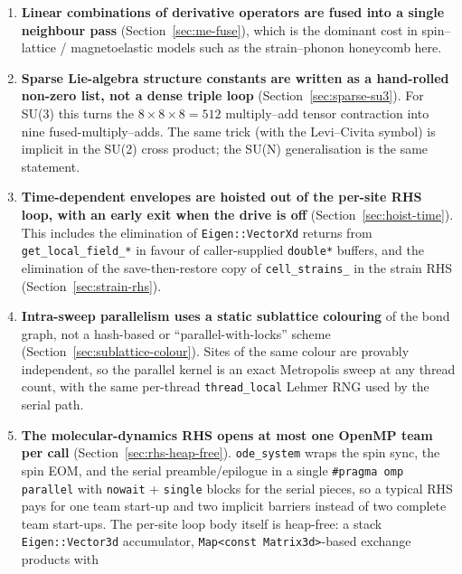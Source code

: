 \documentclass[11pt,letterpaper]{article}
\begin{document}
\begin{enumerate}[itemsep=2pt]
{        indices} (Section~\ref{sec:trilinear}) so that one Metropolis
        proposal costs $O(d^{3}) + O(d)$ instead of $2\,O(d^{3})$.
  \item \textbf{Linear combinations of derivative operators are fused
        into a single neighbour pass} (Section~\ref{sec:me-fuse}),
        which is the dominant cost in spin--lattice / magnetoelastic
        models such as the strain--phonon honeycomb here.
  \item \textbf{Sparse Lie-algebra structure constants are written
        as a hand-rolled non-zero list, not a dense triple loop}
        (Section~\ref{sec:sparse-su3}).  For SU(3) this turns the
        $8 \times 8 \times 8 = 512$ multiply--add tensor contraction
        into nine fused-multiply--adds.  The same trick (with the
        Levi--Civita symbol) is implicit in the SU(2) cross product;
        the SU(N) generalisation is the same statement.
  \item \textbf{Time-dependent envelopes are hoisted out of the
        per-site RHS loop, with an early exit when the drive is
        off} (Section~\ref{sec:hoist-time}).  This includes the
        elimination of \texttt{Eigen::VectorXd} returns from
        \texttt{get\_local\_field\_*} in favour of caller-supplied
        \texttt{double*} buffers, and the elimination of the
        save-then-restore copy of \texttt{cell\_strains\_} in the
        strain RHS (Section~\ref{sec:strain-rhs}).
  \item \textbf{Intra-sweep parallelism uses a static sublattice
        colouring} of the bond graph, not a hash-based or
        ``parallel-with-locks'' scheme
        (Section~\ref{sec:sublattice-colour}).  Sites of the same
        colour are provably independent, so the parallel kernel is
        an exact Metropolis sweep at any thread count, with the
        same per-thread \texttt{thread\_local} Lehmer RNG used by
        the serial path.
  \item \textbf{The molecular-dynamics RHS opens at most one
        OpenMP team per call} (Section~\ref{sec:rhs-heap-free}).
        \texttt{ode\_system} wraps the spin sync, the spin EOM,
        and the serial preamble/epilogue in a single
        \texttt{\#pragma omp parallel} with \texttt{nowait} +
        \texttt{single} blocks for the serial pieces, so a typical
        RHS pays for one team start-up and two implicit barriers
        instead of two complete team start-ups.  The per-site loop
        body itself is heap-free: a stack
        \texttt{Eigen::Vector3d} accumulator,
        \texttt{Map<const Matrix3d>}-based exchange products with

\end{enumerate}
\end{document}
